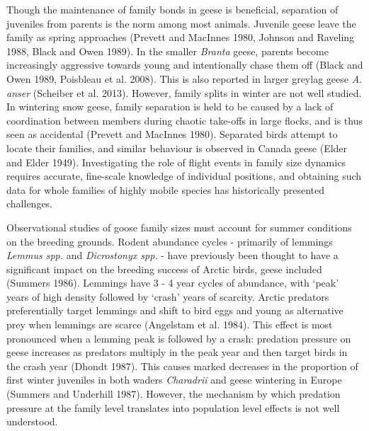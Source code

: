 \documentclass[10pt,twocolumn]{paper}
\begin{document}
Though the maintenance of family bonds in geese is beneficial,
separation of juveniles from parents is the norm among most animals.
Juvenile geese leave the family as spring approaches (Prevett and
MacInnes 1980, Johnson and Raveling 1988, Black and Owen 1989). In the
smaller \emph{Branta} geese, parents become increasingly aggressive
towards young and intentionally chase them off (Black and Owen 1989,
Poisbleau et al. 2008). This is also reported in larger greylag geese
\emph{A. anser} (Scheiber et al. 2013). However, family splits in winter
are not well studied. In wintering snow geese, family separation is held
to be caused by a lack of coordination between members during chaotic
take-offs in large flocks, and is thus seen as accidental (Prevett and
MacInnes 1980). Separated birds attempt to locate their families, and
similar behaviour is observed in Canada geese (Elder and Elder 1949).
Investigating the role of flight events in family size dynamics requires
accurate, fine-scale knowledge of individual positions, and obtaining
such data for whole families of highly mobile species has historically
presented challenges.

Observational studies of goose family sizes must account for summer
conditions on the breeding grounds. Rodent abundance cycles - primarily
of lemmings \emph{Lemmus spp.} and \emph{Dicrostonyx spp.} - have
previously been thought to have a significant impact on the breeding
success of Arctic birds, geese included (Summers 1986). Lemmings have 3
- 4 year cycles of abundance, with `peak' years of high density followed
by `crash' years of scarcity. Arctic predators preferentially target
lemmings and shift to bird eggs and young as alternative prey when
lemmings are scarce (Angelstam et al. 1984). This effect is most
pronounced when a lemming peak is followed by a crash: predation
pressure on geese increases as predators multiply in the peak year and
then target birds in the crash year (Dhondt 1987). This causes marked
decreases in the proportion of first winter juveniles in both waders
\emph{Charadrii} and geese wintering in Europe (Summers and Underhill
1987). However, the mechanism by which predation pressure at the family
level translates into population level effects is not well understood.
\end{document}
